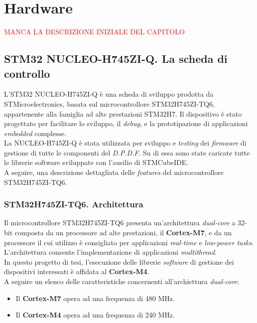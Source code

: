 
\chapter{Hardware}
\textcolor{red}{MANCA LA DESCRIZIONE INIZIALE DEL CAPITOLO}

\section{STM32 NUCLEO-H745ZI-Q. La scheda di controllo}

L'STM32 NUCLEO-H745ZI-Q è una scheda di sviluppo prodotta da STMicroelectronics, basata sul microcontrollore STM32H745ZI-TQ6, appartenente alla famiglia ad alte prestazioni STM32H7. Il dispositivo è stato progettato per facilitare lo sviluppo, il \textit{debug}, e la prototipazione di applicazioni 
\textit{embedded} complesse.\\
La NUCLEO-H745ZI-Q è stata utilizzata per sviluppo e \textit{testing} dei \textit{firmware} di gestione di tutte le componenti del \textit{D.P.D.F}.
Su di essa sono state caricate tutte le librerie software sviluppate con l'ausilio di STMCubeIDE.\\
A seguire, una descrizione dettagliata delle \textit{features} del microcontrollore STM32H745ZI-TQ6.

\subsection{{STM32H745ZI-TQ6. Architettura}}
Il microcontrollore STM32H745ZI-TQ6 presenta un'architettura \textit{dual-core} a 32-bit composta da un processore ad alte prestazioni, il \textbf{Cortex-M7}, e da un processore il cui utilizzo è consigliato per applicazioni \textit{real-time} e \textit{low-power tasks}.
L'architettura consente l'implementazione di applicazioni \textit{multithread}.\\
In questo progetto di tesi, l'esecuzione delle librerie \textit{software} di gestione dei dispositivi interessati è affidata al \textbf{Cortex-M4}.\\
A seguire un elenco delle caratteristiche concernenti all'archiettura \textit{dual-core}:
\begin{itemize}
    \item Il \textbf{Cortex-M7} opera ad una frequenza di 480 MHz.
    \item Il \textbf{Cortex-M4} opera ad una frequenza di 240 MHz.
\end{itemize}


